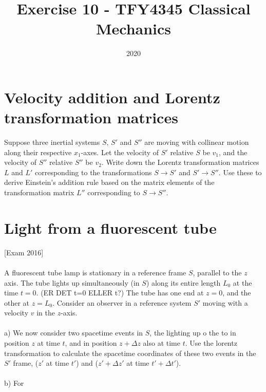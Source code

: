 \documentclass{article}
\title{Exercise 10 - TFY4345 Classical Mechanics}
\date{2020}
\begin{document}
    \maketitle
    \section{Velocity addition and Lorentz transformation matrices}
    Suppose three inertial systems $S, \, S'$ and $S''$ are moving with collinear motion along their respective $x_1$-axes. Let the velocity of $S'$ relative $S$ be $v_1$, and the velocity of $S''$ relative $S''$ be $v_2$. Write down the Lorentz transformation matrices $L$ and $L'$ corresponding to the transformations $S \rightarrow S'$ and $S' \rightarrow S''$. Use these to derive Einstein's addition rule based on the matrix elements of the transformation matrix $L''$ corresponding to $S \rightarrow S''$. \newline {} 
    \section{Light from a fluorescent tube}
        [Exam 2016] \\ \\
        A fluorescent tube lamp is stationary in a reference frame $S$, parallel to the $z$ axis. The tube lights up simultaneously (in $S$) along its entire length $L_0$ at the time $t=0$. (ER DET t=0 ELLER t?) The tube has one end at $z=0$, and the other at $z = L_0$. Consider an observer in a reference system $S'$ moving with a velocity $v$ in the $z$-axis. \\ \\
        a) We now consider two spacetime events in $S$, the lighting up o the to in position $z$ at time $t$, and in position $z + \Delta z$ also at time $t$. Use the lorentz transformation to calculate the spacetime coordinates of these two events in the $S'$ frame, ($z'$ at time $t'$) and ($z' + \Delta z'$ at time $t' + \Delta t'$). \\ \\
        b) For
\end{document}
